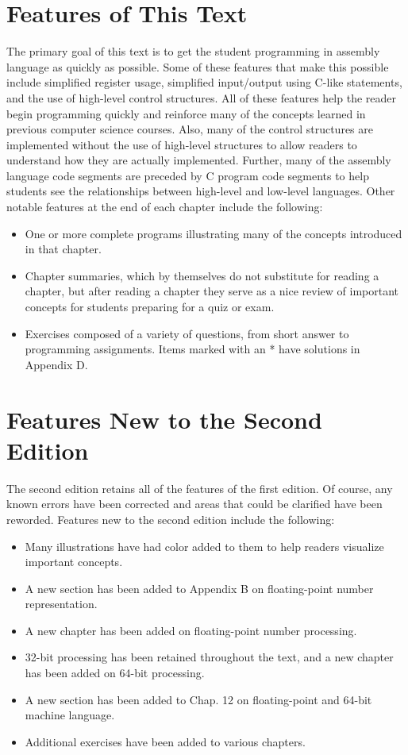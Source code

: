 \documentclass[10pt]{book}
\begin{document}
\section{Features of This Text}
The primary goal of this text is to get the student programming in assembly language as quickly as possible. Some of these features that make this possible include simplified register usage, simplified input/output using C-like statements, and the use of high-level control structures. All of these features help the reader begin programming quickly and reinforce many of the concepts learned in previous computer science courses. Also, many of the control structures are implemented without the use of high-level structures to allow readers to understand how they are actually implemented. Further, many of the assembly language code segments are preceded by C program code segments to help students see the relationships between high-level and low-level languages. Other notable features at the end of each chapter include the following:

\begin{itemize}
  \item One or more complete programs illustrating many of the concepts introduced in that chapter.
  \item Chapter summaries, which by themselves do not substitute for reading a chapter, but after reading a chapter they serve as a nice review of important concepts for students preparing for a quiz or exam.
  \item Exercises composed of a variety of questions, from short answer to programming assignments. Items marked with an * have solutions in Appendix D.
\end{itemize}


\section{Features New to the Second Edition}
The second edition retains all of the features of the first edition. Of course, any known errors have been corrected and areas that could be clarified have been reworded. Features new to the second edition include the following:

\begin{itemize}
  \item Many illustrations have had color added to them to help readers visualize important concepts.
  \item A new section has been added to Appendix B on floating-point number representation.
  \item A new chapter has been added on floating-point number processing.
  \item 32-bit processing has been retained throughout the text, and a new chapter has been added on 64-bit processing.
  \item A new section has been added to Chap. 12 on floating-point and 64-bit machine language.
  \item Additional exercises have been added to various chapters.
\end{itemize}
\end{document}
